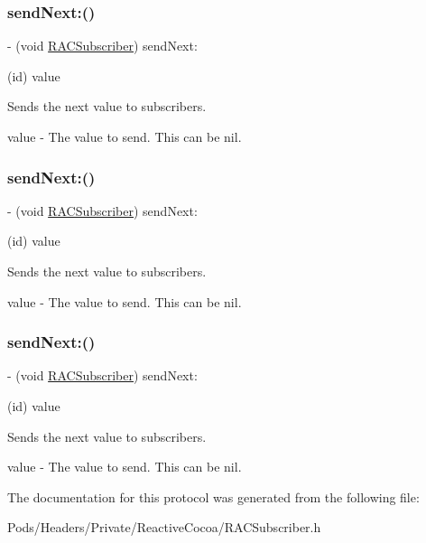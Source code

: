 \subsubsection{\texorpdfstring{send\+Next\+:()}{sendNext:()}\hspace{0.1cm}{\footnotesize\ttfamily [1/3]}}
{\footnotesize\ttfamily -\/ (void \mbox{\hyperlink{interface_r_a_c_subscriber}{R\+A\+C\+Subscriber}}) send\+Next\+: \begin{DoxyParamCaption}\item[{(id)}]{value }\end{DoxyParamCaption}\hspace{0.3cm}{\ttfamily [required]}}

Sends the next value to subscribers.

value -\/ The value to send. This can be {\ttfamily nil}. \mbox{\label{protocol_r_a_c_subscriber_01-p_ac5b675c8be8a83f8e7b7d96301cd6656}} 
\subsubsection{\texorpdfstring{send\+Next\+:()}{sendNext:()}\hspace{0.1cm}{\footnotesize\ttfamily [2/3]}}
{\footnotesize\ttfamily -\/ (void \mbox{\hyperlink{interface_r_a_c_subscriber}{R\+A\+C\+Subscriber}}) send\+Next\+: \begin{DoxyParamCaption}\item[{(id)}]{value }\end{DoxyParamCaption}\hspace{0.3cm}{\ttfamily [required]}}

Sends the next value to subscribers.

value -\/ The value to send. This can be {\ttfamily nil}. \mbox{\label{protocol_r_a_c_subscriber_01-p_ac5b675c8be8a83f8e7b7d96301cd6656}} 
\subsubsection{\texorpdfstring{send\+Next\+:()}{sendNext:()}\hspace{0.1cm}{\footnotesize\ttfamily [3/3]}}
{\footnotesize\ttfamily -\/ (void \mbox{\hyperlink{interface_r_a_c_subscriber}{R\+A\+C\+Subscriber}}) send\+Next\+: \begin{DoxyParamCaption}\item[{(id)}]{value }\end{DoxyParamCaption}\hspace{0.3cm}{\ttfamily [required]}}

Sends the next value to subscribers.

value -\/ The value to send. This can be {\ttfamily nil}. 

The documentation for this protocol was generated from the following file\+:\begin{DoxyCompactItemize}
\item 
Pods/\+Headers/\+Private/\+Reactive\+Cocoa/R\+A\+C\+Subscriber.\+h\end{DoxyCompactItemize}
